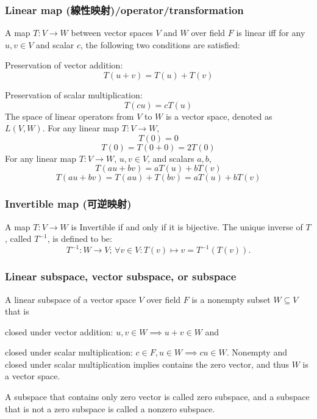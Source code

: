 \documentclass[a4paper,12pt]{report}
\begin{document}
\subsubsection{Linear map (線性映射)/operator/transformation}
A map $T\colon V\to W$ between vector spaces $V$ and $W$ over field $F$ is linear iff for any $u,v\in V$ and scalar $c$, the following two conditions are satisfied:
\bit
\item Preservation of vector addition:
  \[T(u+v)=T(u)+T(v)\]
\item Preservation of scalar multiplication:
  \[T(cu)=cT(u)\]
\eit
The space of linear operators from $V$ to $W$ is a vector space, denoted as $L(V,W)$.
For any linear map $T\colon V\to W$,
\[T(0)=0\]
\bpr
\[T(0)=T(0+0)=2T(0)\]
\epr
For any linear map $T\colon V\to W$, $u,v\in V$, and scalars $a,b$,
\[T(au+bv)=aT(u)+bT(v)\]
\bpr
\[T(au+bv)=T(au)+T(bv)=aT(u)+bT(v)\]
\epr
\subsubsection{Invertible map (可逆映射)}
A map $T\colon V\to W$ is Invertible if and only if it is bijective. The unique inverse of $T$, called $T^{-1}$, is defined to be:
\[T^{-1}\colon W\to V;\,\forall v\in V\colon T(v)\mapsto v=T^{-1}(T(v)).\]
\subsubsection{Linear subspace, vector subspace, or subspace}
A linear subspace of a vector space $V$ over field $F$ is a nonempty subset $W\subseteq V$ that is
\bit
\item closed under vector addition: $u,v\in W\implies u+v\in W$ and
\item closed under scalar multiplication: $c\in F,u\in W\implies cu\in W$.
\eit
Nonempty and closed under scalar multiplication implies contains the zero vector, and thus $W$ is a vector space.

A subspace that contains only zero vector is called zero subspace, and a subspace that is not a zero subspace is called a nonzero subspace.
\end{document}
